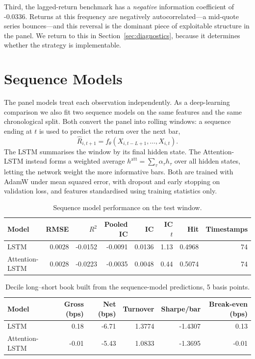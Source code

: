 \documentclass[11pt]{article}
\begin{document}
Third, the lagged-return benchmark has a \emph{negative} information
coefficient of -0.0336. Returns at this frequency are negatively
autocorrelated---a mid-quote series bounces---and this reversal is the dominant
piece of exploitable structure in the panel. We return to this in
Section~\ref{sec:diagnostics}, because it determines whether the strategy is
implementable.


\section{Sequence Models}

The panel models treat each observation independently. As a deep-learning
comparison we also fit two sequence models on the same features and the same
chronological split. Both convert the panel into rolling windows: a sequence
ending at $t$ is used to predict the return over the next bar,
\[
\widehat R_{i,t+1} = f_\theta\!\left(X_{i,t-L+1}, \dots, X_{i,t}\right).
\]
The LSTM summarises the window by its final hidden state. The Attention-LSTM
instead forms a weighted average $h^{\text{att}} = \sum_{\tau} \alpha_\tau
h_\tau$ over all hidden states, letting the network weight the more informative
bars. Both are trained with AdamW under mean squared error, with dropout and
early stopping on validation loss, and features standardised using training
statistics only.

\begin{table}[!htbp]
\centering
\small
\caption{Sequence model performance on the test window.}
\label{tab:deep}
\begin{tabular}{lrrrrrrr}
\toprule
Model & RMSE & $R^2$ & Pooled IC & IC & IC $t$ & Hit & Timestamps \\
\midrule
LSTM & 0.0028 & -0.0152 & -0.0091 & 0.0136 & 1.13 & 0.4968 & 74 \\
Attention-LSTM & 0.0028 & -0.0223 & -0.0035 & 0.0048 & 0.44 & 0.5074 & 74 \\
\bottomrule
\end{tabular}
\end{table}

\begin{table}[!htbp]
\centering
\small
\caption{Decile long--short book built from the sequence-model predictions,
5 basis points.}
\label{tab:deepport}
\begin{tabular}{lrrrrr}
\toprule
Model & Gross (bps) & Net (bps) & Turnover & Sharpe/bar & Break-even (bps) \\
\midrule
LSTM & 0.18 & -6.71 & 1.3774 & -1.4307 & 0.13 \\
Attention-LSTM & -0.01 & -5.43 & 1.0833 & -1.3695 & -0.01 \\
\bottomrule
\end{tabular}
\end{table}
\end{document}
